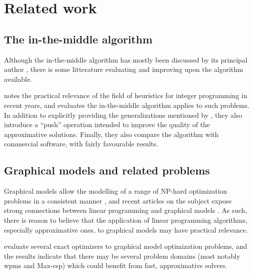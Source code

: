 \section{Related work}


\subsection{The in-the-middle algorithm}
Although the in-the-middle algorithm has mostly been discussed by its principal author \parencites{Wedelin95}{Wedelin08}{Wedelin13}{Alefragis00}, there is some litterature evaluating and improving upon the algorithm available.

\Textcite{Bastert10} notes the practical relevance of the field of heuristics for integer programming in recent years, and evaluates the in-the-middle algorithm applies to such problems. In addition to explicitly providing the generalizations mentioned by \textcite{Wedelin95}, they also introduce a \enquote{push} operation intended to improve the quality of the approximative solutions. Finally, they also compare the algorithm with commercial software, with fairly favourable results.


\subsection{Graphical models and related problems}
Graphical models allow the modelling of a range of NP-hard optimization problems in a consistent manner \parencite{deGivry14}, and recent articles on the subject expose strong connections between linear programming and graphical models \parencites{Werner07}{Kolmogorov13}. As such, there is reason to believe that the application of linear programming algorithms, especially approximative ones, to graphical models may have practical relevance.

\Textcite{deGivry14} evaluate several exact optimizers to graphical model optimization problems, and the results indicate that there may be several problem domains (most notably \gls{wpms} and Max-\acrshort{csp}) which could benefit from fast, approximative solvers.
